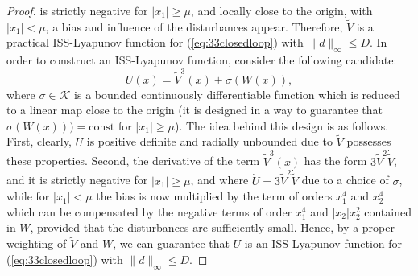 \documentclass[10pt,a4paper]{amsart}
\begin{document}
\begin{proof}
is strictly negative for $|x_{1}|\geq\mu$, and locally close to the
origin, with $|x_{1}|<\mu$, a bias and influence of the disturbances
appear. Therefore, $\tilde{V}$ is a practical ISS-Lyapunov function
for (\ref{eq:33closedloop}) with $\|d\|_{\infty}\leq D$. In order
to construct an ISS-Lyapunov function, consider the following candidate:
\[
U(x)=\tilde{V}^{3}(x)+\sigma(W(x)),
\]
where $\sigma\in\mathcal{K}$ is a bounded continuously differentiable
function which is reduced to a linear map close to the origin (it is designed in a way 
to guarantee that $\sigma(W(x)))=\text{const}$ for $|x_1|\geq\mu$). The
idea behind this design is as follows. First, clearly, $U$ is positive
definite and radially unbounded due to $\tilde{V}$ possesses these
properties. Second, the derivative of the term $\tilde{V}^{3}(x)$
has the form $3\tilde{V}^{2}\dot{\tilde{V}}$, and it is strictly
negative for $|x_{1}|\geq\mu$, and where $\dot{U}=3\tilde{V}^{2}\dot{\tilde{V}}$
due to a choice of $\sigma$, while for $|x_{1}|<\mu$ the bias is
now multiplied by the term of orders $x_{1}^{4}$ and $x_{2}^{4}$
which can be compensated by the negative terms of order $x_{1}^{4}$
and $|x_{2}|x_{2}^{2}$ contained in $\dot{W}$, provided that the
disturbances are sufficiently small. Hence, by a proper weighting
of $\tilde{V}$ and $W$, we can guarantee that $U$ is an ISS-Lyapunov
function for (\ref{eq:33closedloop}) with $\|d\|_{\infty}\leq D$.
\end{proof}
\end{document}
